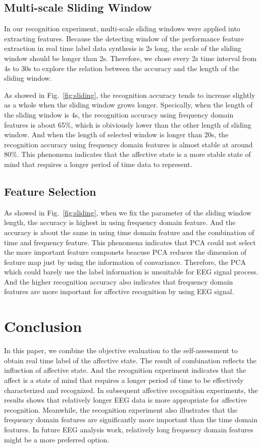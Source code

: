 \documentclass[runningheads,a4paper]{llncs}
\begin{document}
\subsection{Multi-scale Sliding Window}
In our recognition experiment, multi-scale sliding windows were applied into
extracting features. Because the detecting window of the performance feature extraction
in real time label data synthesis is 2s long, the scale of the sliding window
should be longer than 2s. Therefore, we chose every 2s time interval from 4s to
30s to explore the relation between the accuracy and the length of the sliding
window.

As showed in Fig.~\ref{fig:sliding}, the recognition accuracy tends to
increase slightly as a whole when the sliding window grows longer. Specically,
when the length of the sliding window is 4s, the recognition accuracy using
frequency domain features is about 65\%, which is obiviously lower than the
other length of sliding window. And when the length of selected window is
longer than 20s, the recognition accuracy using frequency domain features
is almost stable at around 80\%. This phenomena indicates that the affective
state is a more stable state of mind that requires a longer period of time
data to represent.

\subsection{Feature Selection}
As showed in Fig.~\ref{fig:sliding}, when we fix the parameter of the sliding window
length, the accuracy is highest in using frequency domain feature. And the accuracy
is about the same in using time domain feature and the combination of time and frequency
feature. This phenomena indicates that PCA could not select the more important
feature componets beacuse PCA reduces the dimension of feature map just by using
the information of convariance. Therefore, the PCA which could barely use the label
information is unsuitable for EEG signal process.
And the higher recognition accuracy also indicates that frequency domain features
are more important for affective recognition by using EEG signal.




\section{Conclusion}
In this paper, we combine the objective evaluation to the self-assessment to obtain
real time label of the affective state. The result of combination reflects the influction
of affective state. And the recognition experiment indicates that the affect is
a state of mind that requires a longer period of time to be effectively characterized
and recognized. In subsequent affective recognition experiments,
the results shows that relatively longer
EEG data is more appropriate for affective recognition. Meanwhile, the recognition
experiment also illustrates that the frequency domain features are significantly
more important than the time domain features. In future EEG analysis work, relatively
long frequency domain features might be a more preferred option.
\end{document}
